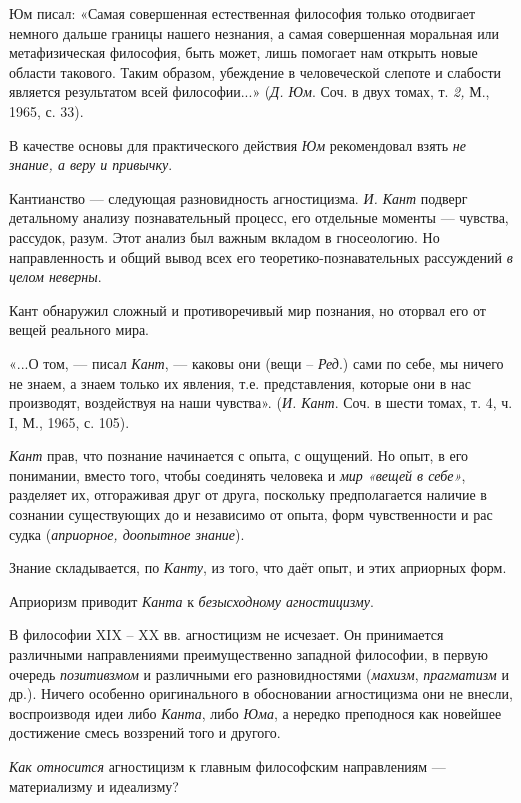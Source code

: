 \documentclass[a4paper,14pt,russian]{extreport}
\begin{document}
Юм писал: «Самая совершенная естественная философия только отодвигает немного дальше границы нашего незнания, а самая совершенная моральная или метафизическая философия, быть может, лишь помогает нам открыть новые области такового. Таким образом, убеждение в человеческой слепоте и слабости является результатом всей философии...» (\emph{Д. Юм}. Соч. в двух томах, т. \emph{2,} М., 1965, с. 33).

В качестве основы для практического действия \emph{Юм} рекомендовал взять \emph{не знание, а веру и привычку}.

Кантианство --- следующая разновидность агностицизма. \emph{И. Кант} подверг детальному анализу познавательный процесс, его отдельные моменты --- чувства, рассудок, разум. Этот анализ был важным вкладом в гносеологию. Но направленность и общий вывод всех его теоретико-познавательных рассуждений \emph{в целом неверны}.

Кант обнаружил сложный и противоречивый мир познания, но оторвал его от вещей реального мира.

«...О том, --- писал \emph{Кант}, --- каковы они (вещи -- \emph{Ред}.) сами по себе, мы ничего не знаем, а знаем только их явления, т.е. представления, которые они в нас производят, воздействуя на наши чувства». (\emph{И. Кант}. Соч. в шести томах, т. 4, ч. I, М., 1965, с. 105).

\emph{Кант} прав, что познание начинается с опыта, с ощущений. Но опыт, в его понимании, вместо того, чтобы соединять человека и \emph{мир «вещей в себе»}, разделяет их, отгораживая друг от друга, поскольку предполагается наличие в сознании существующих до и независимо от опыта, форм чувственности и рас судка (\emph{априорное, доопытное знание}).

Знание складывается, по \emph{Канту}, из того, что даёт опыт, и этих априорных форм.

Априоризм приводит \emph{Канта} к \emph{безысходному агностицизму}.

В философии XIX -- XX вв. агностицизм не исчезает. Он принимается различными направлениями преимущественно западной философии, в первую очередь \emph{позитивзмом} и различными его разновидностями (\emph{махизм}, \emph{прагматизм} и др.). Ничего особенно оригинального в обосновании агностицизма они не внесли, воспроизводя идеи либо \emph{Канта}, либо \emph{Юма}, а нередко преподнося как новейшее достижение смесь воззрений того и другого.

\emph{Как относится} агностицизм к главным философским направлениям --- материализму и идеализму?
\end{document}
